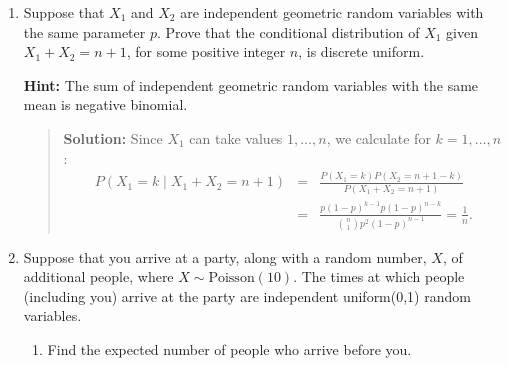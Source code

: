 \documentclass{article}
\begin{document}
\begin{enumerate}
  \item Suppose that $X_1$ and $X_2$ are independent geometric random variables
  with the same parameter $p$. Prove that the conditional distribution of $X_1$
  given $X_1+X_2=n+1$, for some positive integer $n$, is discrete uniform.

  {\bf Hint:} The sum of independent geometric random variables with the same
  mean is negative binomial.
    \begin{quotation} {\bf Solution:}
    Since $X_1$ can take values $1, \ldots, n$, we calculate for $k=1, \ldots, n$:
    \begin{eqnarray*}
    P(X_1=k \mid X_1+X_2 = n+1) 
    &=& \frac{P(X_1=k)P(X_2=n+1-k)}{P(X_1+X_2=n+1)} \\
    &=& \frac{p(1-p)^{k-1}p(1-p)^{n-k}}{ {n\choose 1} p^2(1-p)^{n-1}} = \frac1n.
    \end{eqnarray*}
    \end{quotation}

  \item\label{party} Suppose that you arrive at a party, along with a random
  number, $X$, of additional people, where $X\sim\mbox{Poisson}(10)$. The times
  at which people (including you) arrive at the party are independent
  uniform(0,1) random variables.

  \begin{enumerate}

    \item Find the expected number of people who arrive before you.


\end{enumerate}
\end{enumerate}
\end{document}
